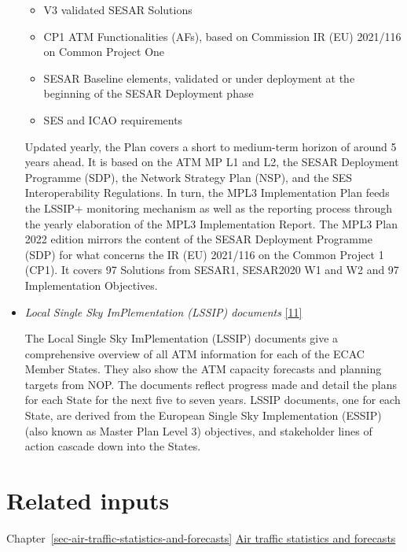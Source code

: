 \documentclass[
  11pt,
  a4paper,
]{book}
\begin{document}
\begin{itemize}
  \begin{itemize}
  \item
    V3 validated SESAR Solutions
  \item
    CP1 ATM Functionalities (AFs), based on Commission IR (EU) 2021/116
    on Common Project One
  \item
    SESAR Baseline elements, validated or under deployment at the
    beginning of the SESAR Deployment phase
  \item
    SES and ICAO requirements
  \end{itemize}

  Updated yearly, the Plan covers a short to medium-term horizon of
  around 5 years ahead. It is based on the ATM MP L1 and L2, the SESAR
  Deployment Programme (SDP), the Network Strategy Plan (NSP), and the
  SES Interoperability Regulations. In turn, the MPL3 Implementation
  Plan feeds the LSSIP+ monitoring mechanism as well as the reporting
  process through the yearly elaboration of the MPL3 Implementation
  Report. The MPL3 Plan 2022 edition mirrors the content of the SESAR
  Deployment Programme (SDP) for what concerns the IR (EU) 2021/116 on
  the Common Project 1 (CP1). It covers 97 Solutions from SESAR1,
  SESAR2020 W1 and W2 and 97 Implementation Objectives.
\item
  \emph{Local Single Sky ImPlementation (LSSIP) documents}
  \protect\hyperlink{ref-ectrl:lssip}{{[}11{]}}

  The Local Single Sky ImPlementation (LSSIP) documents give a
  comprehensive overview of all ATM information for each of the ECAC
  Member States. They also show the ATM capacity forecasts and planning
  targets from NOP. The documents reflect progress made and detail the
  plans for each State for the next five to seven years. LSSIP
  documents, one for each State, are derived from the European Single
  Sky Implementation (ESSIP) (also known as Master Plan Level 3)
  objectives, and stakeholder lines of action cascade down into the
  States.
\end{itemize}

\hypertarget{related-inputs-1}{%
\section{Related inputs}\label{related-inputs-1}}

Chapter~\ref{sec-air-traffic-statistics-and-forecasts}
\protect\hyperlink{sec-air-traffic-statistics-and-forecasts}{Air traffic
statistics and forecasts}
\end{document}
